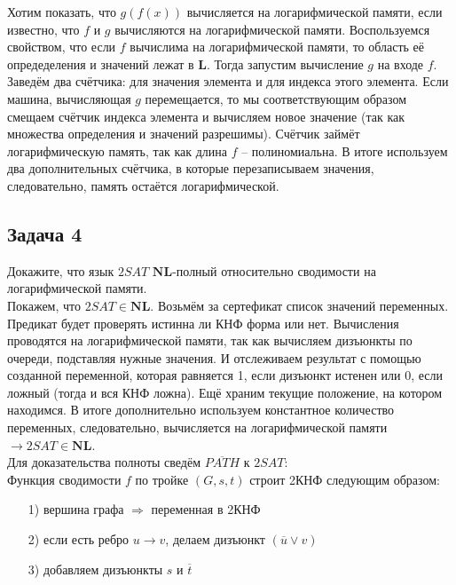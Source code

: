 \documentclass[a4paper,12pt]{article} %
\begin{document}
Хотим показать, что $ g(f(x)) $ вычисляется на логарифмической памяти, если известно, что $ f $ и $ g $ вычисляются на логарифмической памяти. Воспользуемся свойством, что если $ f $ вычислима на логарифмической памяти, то область её опредеделения и значений лежат в $\mathbf{L}$. Тогда запустим вычисление $ g $ на входе $ f $. \\ Заведём два счётчика: для значения элемента и для индекса этого элемента. Если машина, вычисляющая $ g $ перемещается, то мы соответствующим образом смещаем счётчик индекса элемента и вычисляем новое значение (так как множества определения и значений разрешимы). Счётчик займёт логарифмическую память, так как длина $ f $ -- полиномиальна. В итоге используем два дополнительных счётчика, в которые перезаписываем значения, следовательно, память остаётся логарифмической.  

\subsection*{Задача 4}
Докажите, что язык $2SAT$ $\mathbf{NL}$-полный относительно сводимости на логарифмической памяти.\\

Покажем, что $2SAT \in \mathbf{NL}$. Возьмём за сертефикат список значений переменных. Предикат будет проверять истинна ли КНФ форма или нет. Вычисления проводятся на логарифмической памяти, так как вычисляем дизъюнкты по очереди, подставляя нужные значения. И отслеживаем результат с помощью созданной переменной, которая равняется 1, если дизъюнкт истенен или 0, если ложный (тогда и вся КНФ ложна). Ещё храним текущие положение, на котором находимся. В итоге дополнительно используем константное количество переменных, следовательно, вычисляется на логарифмической памяти $ \longrightarrow 2SAT \in \mathbf{NL} $.\\

Для доказательства полноты сведём $\overline{PATH}$ к $2SAT$:\\
Функция сводимости $ f $ по тройке $ (G, s, t) $ строит 2КНФ следующим образом:
\begin{itemize}
\item[1)] вершина графа $ \Rightarrow $ переменная в 2КНФ
\item[2)] если есть ребро $ u \rightarrow v $, делаем дизъюнкт $ (\overline{u} \vee v) $
\item[3)] добавляем дизъюнкты $ s $ и $ \overline{t} $
\end{itemize}
\end{document}
